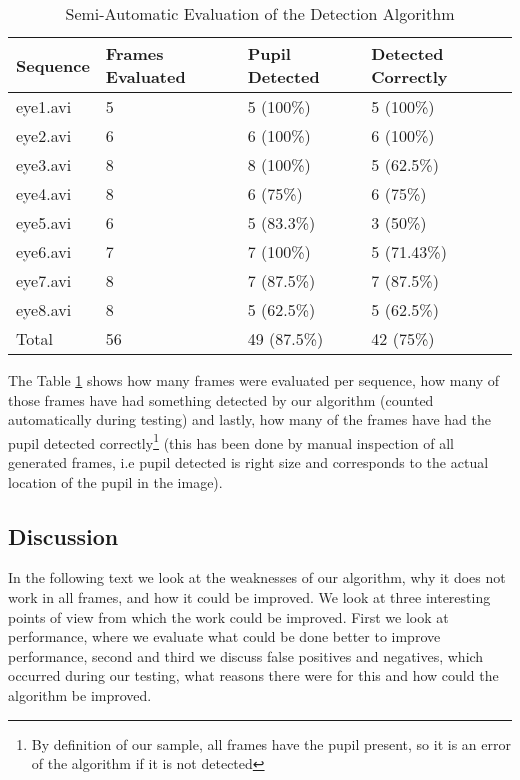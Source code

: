 \begin{table}[h!]
	\center
	\begin{tabular}{ |l|l|l|l| }
		\hline
		Sequence & Frames Evaluated & Pupil Detected & Detected Correctly \\ \hline
		
		eye1.avi 	& 5 	& 5 (100\%)	& 5 (100\%) \\
		eye2.avi 	& 6 	& 6 (100\%)	& 6 (100\%) \\
		eye3.avi 	& 8 	& 8 (100\%)	& 5 (62.5\%) \\
		eye4.avi 	& 8 	& 6 (75\%)	& 6 (75\%) \\
		eye5.avi 	& 6 	& 5 (83.3\%)	& 3 (50\%) \\
		eye6.avi 	& 7 	& 7 (100\%)	& 5 (71.43\%) \\
		eye7.avi 	& 8 	& 7 (87.5\%)	& 7 (87.5\%) \\
		eye8.avi 	& 8 	& 5 (62.5\%)	& 5 (62.5\%) \\
		
		\hline
		Total 	& 56 & 49 (87.5\%) & 42 (75\%) \\ 
		\hline
	\end{tabular}
	\caption{Semi-Automatic Evaluation of the Detection Algorithm}
	\label{tab:eval}
\end{table}

The Table \ref{tab:eval} shows how many frames were evaluated per sequence, how many of those frames have had something detected by our algorithm (counted automatically during testing) and lastly, how many of the frames have had the pupil detected correctly\footnote{By definition of our sample, all frames have the pupil present, so it is an error of the algorithm if it is not detected} (this has been done by manual inspection of all generated frames, i.e pupil detected is right size and corresponds to the actual location of the pupil in the image). 

\subsection{Discussion}
In the following text we look at the weaknesses of our algorithm, why it does not work in all frames, and how it could be improved. We look at three interesting points of view from which the work could be improved. First we look at performance, where we evaluate what could be done better to improve performance, second and third we discuss false positives and negatives, which occurred during our testing, what reasons there were for this and how could the algorithm be improved.

